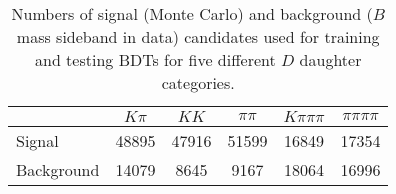 \begin{table}[h]
  \centering
  \begin{tabular}{lccccc}
      \toprule
      & $K\pi$ & $KK$ & $\pi\pi$ & $K\pi\pi\pi$ & $\pi\pi\pi\pi$ \\
      \midrule
      Signal & 48895 & 47916 & 51599 & 16849 & 17354 \\
      Background & 14079 & 8645 & 9167 & 18064 & 16996 \\
      \bottomrule
  \end{tabular}
  \caption{\small Numbers of signal (Monte Carlo) and background ($B$ mass sideband in data) candidates used for training and testing BDTs for five different $D$ daughter categories.}
\label{tab:BDT_n_events}
\end{table}
